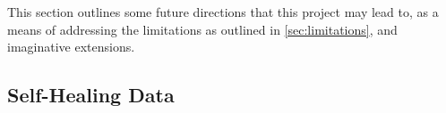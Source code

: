 This section outlines some future directions that this project may lead to, as a means of addressing the limitations as outlined in \cref{sec:limitations}, and imaginative extensions.

\subsection{Self-Healing Data}

